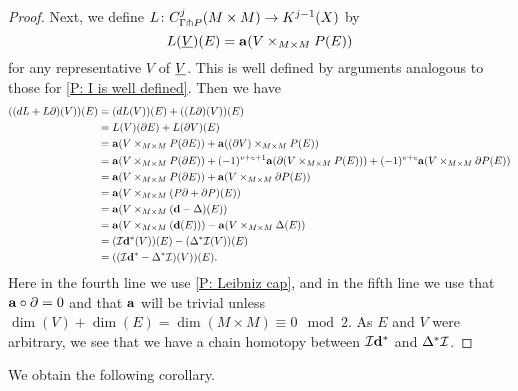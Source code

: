 \documentclass{amsart}
\begin{document}
\begin{proof}
	Next, we define $L \colon C^j_{\Gamma \pitchfork P}(M \times M) \to K^{j-1}(X)$ by $$L(\underline{V})(E) = \mathbf{a}(V \times_{M \times M} P(E))$$
	for any representative $V$ of $\underline{V}$.
	This is well defined by arguments analogous to those for \cref{P: I is well defined}.
	Then we have
	\begin{align*}
		((dL + L\partial)(V))(E) &=(dL(V))(E) + ((L\partial)(V))(E) \\
			& = L(V)(\partial E) +L(\partial V)(E)\\
			& = \mathbf{a}(V \times_{M \times M} P(\partial E)) + \mathbf{a}((\partial V) \times_{M \times M} P(E))\\
			& = \mathbf{a}(V \times_{M \times M} P(\partial E)) + (-1)^{v+e+1}\mathbf{a}(\partial(V \times_{M \times M} P(E)))+(-1)^{v+e}\mathbf{a}(V \times_{M \times M} \partial P(E))\\
			&=\mathbf{a}(V \times_{M \times M} P(\partial E)) +\mathbf{a}(V \times_{M \times M} \partial P(E))\\
			&=\mathbf{a}(V \times_{M \times M} (P\partial + \partial P)(E))\\
			&=\mathbf{a}(V \times_{M \times M} (\mathbf{d} - \Delta)(E))\\
			&=\mathbf{a}(V \times_{M \times M} (\mathbf{d}(E))) - \mathbf{a}(V \times_{M \times M} \Delta(E))\\
			&=(\mathcal{I} \mathbf{d}^*(V))(E)- 	(\Delta^*\mathcal{I}(V))(E)\\
			&=((\mathcal{I} \mathbf{d}^*- \Delta^*\mathcal{I})(V))(E).
	\end{align*}
	Here in the fourth line we use \cref{P: Leibniz cap}, and in the fifth line we use that $\mathbf{a} \circ \partial =0$ and that $\mathbf{a}$ will be trivial unless $\dim(V)+ \dim(E) = \dim(M \times M) \equiv 0 \mod 2$.
	As $E$ and $V$ were arbitrary, we see that we have a chain homotopy between $\mathcal{I} \mathbf{d}^*$ and $\Delta^*\mathcal{I}$.
\end{proof}

We obtain the following corollary.
\end{document}
